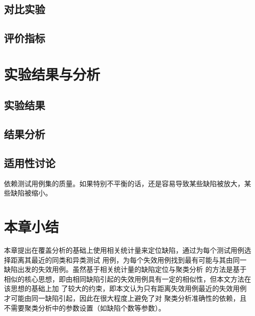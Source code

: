 \subsection{对比实验}
\subsection{评价指标}
\section{实验结果与分析}
\subsection{实验结果}
\subsection{结果分析}
\subsection{适用性讨论}
依赖测试用例集的质量。如果特别不平衡的话，还是容易导致某些缺陷被放大，某些缺陷被缩小。
\section{本章小结}
本章提出在覆盖分析的基础上使用相关统计量来定位缺陷，通过为每个测试用例选择距离其最近的同类和异类测试
用例，为每个失效用例找到最有可能与其由同一缺陷出发的失效用例。虽然基于相关统计量的缺陷定位与聚类分析
的方法是基于相似的核心思想，即由相同缺陷引起的失效用例具有一定的相似性，但本文方法在该思想的基础上加
了较大的约束，即本文认为只有距离失效用例最近的失效用例才可能由同一缺陷引起，因此在很大程度上避免了对
聚类分析准确性的依赖，且不需要聚类分析中的参数设置（如缺陷个数等参数）。
